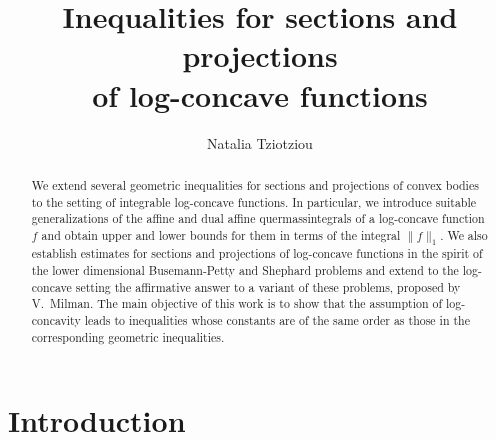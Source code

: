 \documentclass[11pt,leqno]{article}
\theoremstyle{definition}
\theoremstyle{remark}
\numberwithin{equation}{section}
\newcommand{\1}{\textbf{1}}
\begin{document}
\small

\title{\bf Inequalities for sections and projections\\ of log-concave functions}

\medskip

\author{Natalia Tziotziou}

\date{}
\maketitle

\begin{abstract}\footnotesize We extend several geometric inequalities for sections and projections of convex bodies to the setting of integrable log-concave functions. In particular, we introduce suitable generalizations of the affine and dual affine quermassintegrals of a log-concave function $f$ and obtain upper and lower bounds for them in terms of the integral $\|f\|_1$. We also establish estimates for sections and projections of log-concave functions in the spirit of the lower dimensional Busemann-Petty and Shephard problems
and extend to the log-concave setting the affirmative answer to a variant of these problems, proposed by V.~Milman. The main objective of this work is to show that the assumption of
log-concavity leads to inequalities whose constants are of the same order as those in the corresponding geometric inequalities.
\end{abstract}



\section{Introduction}
\end{document}
